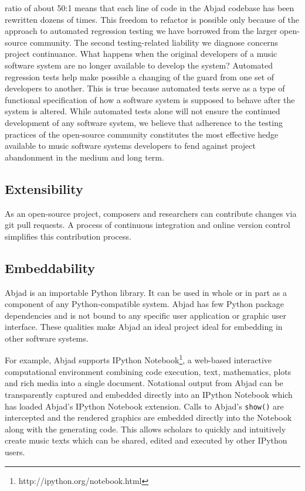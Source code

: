\documentclass{article}
\begin{document}
ratio of about 50:1 means that each line of code in the Abjad codebase has been rewritten dozens of times. This freedom to refactor is possible only because of the approach to automated regression testing we have borrowed from the larger open-source community.
The second testing-related liability we diagnose concerns project continuance. What happens when the original developers of a music software system are no longer available to develop the system? Automated regression tests help make possible a changing of the guard from one set of developers to another. This is true because automated tests serve as a type of functional specification of how a software system is supposed to behave after the system is altered. While automated tests alone will not ensure the continued development of any software system, we believe that adherence to the testing practices of the open-source community constitutes the most effective hedge available to music software systems developers to fend against project abandonment in the medium and long term.

\subsection{Extensibility}

As an open-source project, composers and researchers can contribute changes via
git pull requests. A process of continuous integration and online version
control simplifies this contribution process.

\subsection{Embeddability}

Abjad is an importable Python library. It can be used in whole or in part as a
component of any Python-compatible system. Abjad has few Python package
dependencies and is not bound to any specific user application or graphic user
interface. These qualities make Abjad an ideal project ideal for embedding in
other software systems.

For example, Abjad supports IPython
Notebook\footnote{http://ipython.org/notebook.html}, a web-based interactive
computational environment combining code execution, text, mathematics, plots
and rich media into a single document. Notational output from Abjad can be
transparently captured and embedded directly into an IPython Notebook which has
loaded Abjad's IPython Notebook extension. Calls to Abjad's \texttt{show()} are
intercepted and the rendered graphics are embedded directly into the Notebook
along with the generating code. This allows scholars to quickly and intuitively
create music texts which can be shared, edited and executed by other IPython
users.
\end{document}
